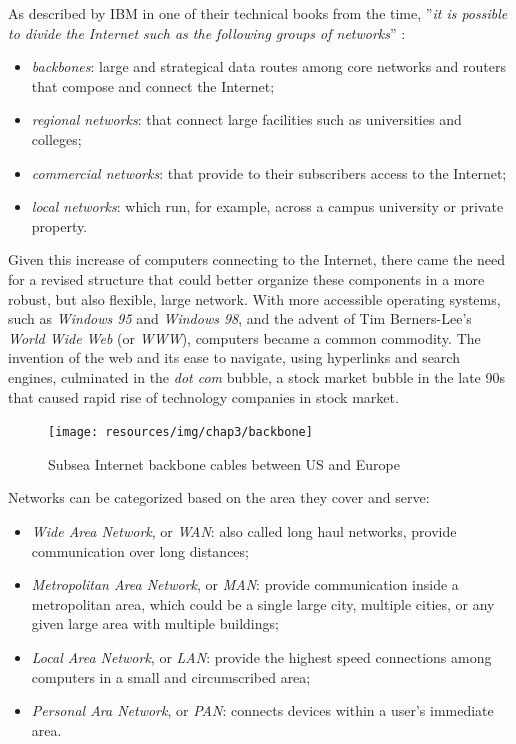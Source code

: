 		As described by IBM in one of their technical books from the time, ''\textit{it is possible to divide the Internet such as the following groups of networks}'' \cite{gg243376}:
		\begin{itemize}
			\item \textit{backbones}: large and strategical data routes among core networks and routers that compose and connect the Internet;
			\item \textit{regional networks}: that connect large facilities such as universities and colleges;
			\item \textit{commercial networks}: that provide to their subscribers access to the Internet;
			\item \textit{local networks}: which run, for example, across a campus university or private property.
		\end{itemize}

		Given this increase of computers connecting to the Internet, there came the need for a revised structure that could better organize these components in a more robust, but also flexible, large network.
		With more accessible operating systems, such as \textit{Windows 95} and \textit{Windows 98}, and the advent of Tim Berners-Lee's \textit{World Wide Web} (or \textit{WWW}), computers became a common commodity.
		The invention of the web and its ease to navigate, using hyperlinks and search engines, culminated in the \textit{dot com} bubble, a stock market bubble in the late 90s that caused rapid rise of technology companies in stock market.
	
		\begin{figure}[H]
			\centering
			\texttt{[image: resources/img/chap3/backbone]}
			\caption[Subsea Internet backbone cables between US and Europe]{Subsea Internet backbone cables between US and Europe\footnotemark}
		\end{figure}
	
		Networks can be categorized based on the area they cover and serve:
		\begin{itemize}
			\item \textit{Wide Area Network}, or \textit{WAN}: also called long haul networks, provide communication over long distances;
			\item \textit{Metropolitan Area Network}, or \textit{MAN}: provide communication inside a metropolitan area, which could be a single large city, multiple cities, or any given large area with multiple buildings;
			\item \textit{Local Area Network}, or \textit{LAN}: provide the highest speed connections among computers in a small and circumscribed area;
			\item \textit{Personal Ara Network}, or \textit{PAN}: connects devices within a user's immediate area.
		\end{itemize}
	
